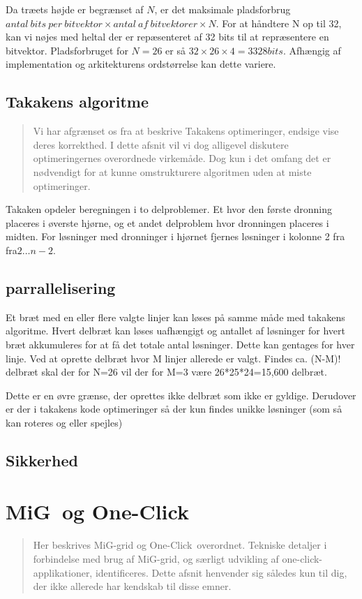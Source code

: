 \documentclass[draft,a4paper,10pt]{article}
\newcommand{\mig}{MiG}
\newcommand{\oc}{One-Click}
\begin{document}
Da træets højde er begrænset af $N$, er det maksimale pladsforbrug $antal\ bits\ per\ bitvektor \times antal\ af\ bitvektorer \times N$. For at håndtere N op til 32, kan vi nøjes med heltal der er repæsenteret af 32 bits til at repræsentere en bitvektor. Pladsforbruget for $N=26$ er så $32\times 26 \times 4 = 3328 bits$. Afhængig af implementation og arkitekturens ordstørrelse kan dette variere.



\subsection{Takakens algoritme}\label{takalgo}
\begin{verse}
	Vi har afgrænset os fra at beskrive Takakens optimeringer, endsige vise deres korrekthed. I dette afsnit vil vi dog alligevel diskutere optimeringernes overordnede virkemåde. Dog kun i det omfang det er nødvendigt for at kunne omstrukturere algoritmen uden at miste optimeringer.   
\end{verse}

Takaken opdeler beregningen i to delproblemer. Et hvor den første dronning placeres i øverste hjørne, og et andet delproblem hvor dronningen placeres i midten. For løsninger med dronninger i hjørnet fjernes løsninger i kolonne 2 fra fra$2 \ldots n-2$. 

\subsection{parrallelisering}

Et bræt med en eller flere valgte linjer kan løses på samme måde med takakens algoritme. Hvert delbræt kan løses uafhængigt og antallet af løsninger for hvert bræt akkumuleres for at få det totale antal løsninger.
Dette kan gentages for hver linje. Ved at oprette delbræt hvor M linjer allerede er valgt. Findes ca. (N-M)! delbræt skal der for N=26 vil der for M=3 være 26*25*24=15,600 delbræt.

Dette er en øvre grænse, der oprettes ikke delbræt som ikke er gyldige. Derudover er der i takakens kode optimeringer så der kun findes unikke løsninger (som så kan roteres og eller spejles) 


\subsection{Sikkerhed}

\section{\mig\ og \oc}\label{migogoneclick}
\begin{verse}
	Her beskrives \mig-grid og \oc\ overordnet. Tekniske detaljer i forbindelse med brug af \mig-grid, og særligt udvikling af one-click-applikationer, identificeres. Dette afsnit henvender sig således kun til dig, der ikke allerede har kendskab til disse emner.  
\end{verse}
\end{document}
